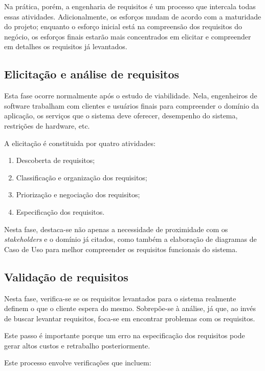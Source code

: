 \documentclass[article, a4paper, oneside, 11pt, english, brazil, sumario=tradicional]{abntex2}
\begin{document}
Na  prática, porém,  a  engenharia  de requisitos  é  um processo  que
intercala todas essas atividades. Adicionalmente, os esforços mudam de
acordo com a maturidade do projeto; enquanto o esforço inicial está na
compreensão dos requisitos do negócio, os esforços finais estarão mais
concentrados em  elicitar e compreender  em detalhes os  requisitos já
levantados.

\subsection{Elicitação e análise de requisitos}
\label{sec:org4eda909}

Esta  fase ocorre  normalmente  após o  estudo  de viabilidade.  Nela,
engenheiros de software trabalham com  clientes e usuários finais para
compreender o  domínio da  aplicação, os serviços  que o  sistema deve
oferecer, desempenho do sistema, restrições de hardware, etc.

A elicitação é constituida por quatro atividades:

\begin{enumerate}
\item Descoberta de requisitos;
\item Classificação e organização dos requisitos;
\item Priorização e negociação dos requisitos;
\item Especificação dos requisitos.
\end{enumerate}

Nesta fase, destaca-se não apenas  a necessidade de proximidade com os
\emph{stakeholders} e  o domínio  já citados, como  também a  elaboração de
diagramas  de  Caso  de  Uso para  melhor  compreender  os  requisitos
funcionais do sistema.

\subsection{Validação de requisitos}
\label{sec:org210c967}

Nesta fase,  verifica-se se  os requisitos  levantados para  o sistema
realmente  definem o  que o  cliente  espera do  mesmo. Sobrepõe-se  à
análise, já  que, ao invés  de buscar levantar requisitos,  foca-se em
encontrar problemas com os requisitos.

Este passo é importante porque um erro na especificação dos requisitos
pode gerar altos custos e retrabalho posteriormente.

Este processo envolve verificações que incluem:
\end{document}
